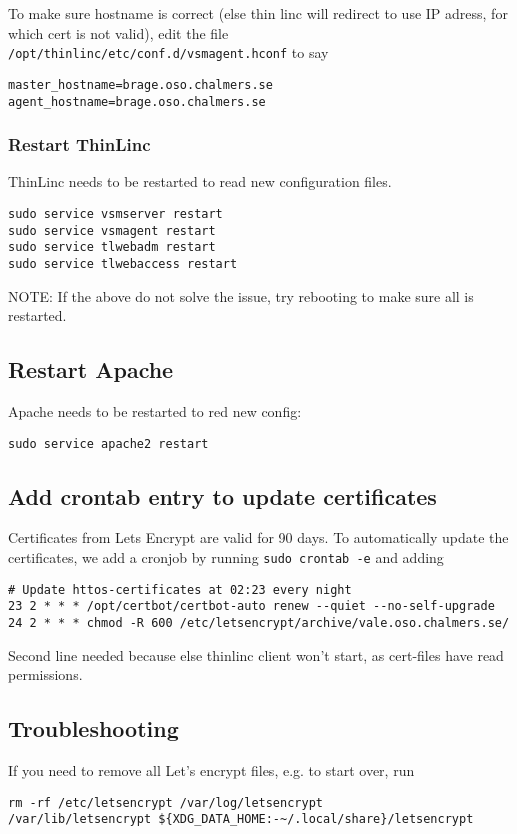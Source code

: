 To make sure hostname is correct (else thin linc will redirect
to use IP adress, for which cert is not valid),
edit the file \verb!/opt/thinlinc/etc/conf.d/vsmagent.hconf!
to say 
\begin{verbatim}
master_hostname=brage.oso.chalmers.se
agent_hostname=brage.oso.chalmers.se
\end{verbatim}

\subsubsection{Restart ThinLinc}
ThinLinc needs to be restarted to read new configuration files.
\begin{verbatim}
sudo service vsmserver restart
sudo service vsmagent restart
sudo service tlwebadm restart
sudo service tlwebaccess restart
\end{verbatim}
NOTE: If the above do not solve the issue, try rebooting to make sure all is
restarted.

\subsection{Restart Apache}
Apache needs to be restarted to red new config:
\begin{verbatim}
sudo service apache2 restart
\end{verbatim}

\subsection{Add crontab entry to update certificates}
Certificates from Lets Encrypt are valid for 90 days. To automatically
update the certificates, we add a cronjob by running
\verb!sudo crontab -e! and adding
\begin{verbatim}
# Update httos-certificates at 02:23 every night
23 2 * * * /opt/certbot/certbot-auto renew --quiet --no-self-upgrade
24 2 * * * chmod -R 600 /etc/letsencrypt/archive/vale.oso.chalmers.se/
\end{verbatim}
Second line needed because else thinlinc client won’t start, as cert-files have read permissions.

\subsection{Troubleshooting}
If you need to remove all Let's encrypt files, e.g. to start over,
run 
\begin{verbatim}
rm -rf /etc/letsencrypt /var/log/letsencrypt 
/var/lib/letsencrypt ${XDG_DATA_HOME:-~/.local/share}/letsencrypt
\end{verbatim}

